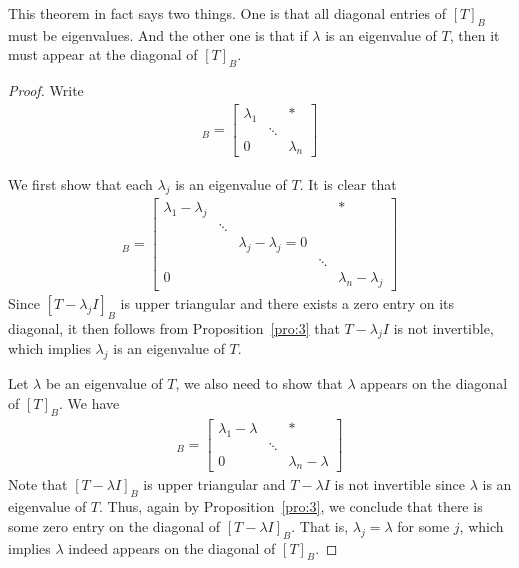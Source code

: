 \documentclass[thmcnt=section, color=blue, 12pt]{my-elegantbook}
\begin{document}
\begin{remark}
    This theorem in fact says two things. One is that all diagonal entries of $[T]_B$ must be eigenvalues. And the other one is that if $\lambda$ is an eigenvalue of $T$, then it must appear at the diagonal of $[T]_B$.
\end{remark}

\begin{proof}
    Write 
    \begin{align*}
        [T]_B = \begin{bmatrix}
            \lambda_1 & & \ast \\ 
            & \ddots & \\ 
            0 & & \lambda_n
        \end{bmatrix}
    \end{align*}

    \par We first show that each $\lambda_j$ is an eigenvalue of $T$. It is clear that 
    \begin{align*}
        [T - \lambda_j I]_B = \begin{bmatrix}
            \lambda_1 - \lambda_j & & & & \ast \\ 
            & \ddots & & & \\ 
            & & \lambda_j - \lambda_j = 0 & &\\ 
            & &   & \ddots &\\ 
            0 & & & & \lambda_n - \lambda_j
        \end{bmatrix}
    \end{align*}
    Since $[T - \lambda_j I]_B$ is upper triangular and there exists a zero entry on its diagonal, it then follows from Proposition~\ref{pro:3} that $T - \lambda_j I$ is not invertible, which implies $\lambda_j$ is an eigenvalue of $T$.

    \par Let $\lambda$ be an eigenvalue of $T$, we also need to show that $\lambda$ appears on the diagonal of $[T]_B$. We have 
    \begin{align*}
        [T - \lambda I]_B = \begin{bmatrix}
            \lambda_1 - \lambda & & \ast \\ 
            & \ddots & \\ 
            0 & & \lambda_n - \lambda
        \end{bmatrix}
    \end{align*}
    Note that $[T - \lambda I]_B$ is upper triangular and $T - \lambda I$ is not invertible since $\lambda$ is an eigenvalue of $T$. Thus, again by Proposition~\ref{pro:3}, we conclude that there is some zero entry on the diagonal of $[T - \lambda I]_B$. That is, $\lambda_j = \lambda$ for some $j$, which implies $\lambda$ indeed appears on the diagonal of $[T]_B$.
\end{proof}
\end{document}
